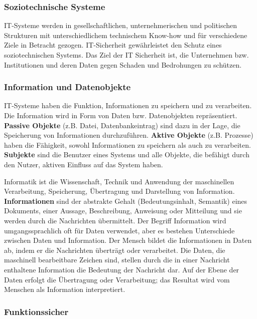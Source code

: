 \subsubsection{Soziotechnische Systeme}

IT-Systeme werden in gesellschaftlichen, unternehmerischen und politischen Strukturen mit unterschiedlichem technischem Know-how und für verschiedene Ziele in Betracht gezogen\cite[23]{eckert2013sicherheit}. IT-Sicherheit gewährleistet den Schutz eines soziotechnischen Systems. Das Ziel der IT Sicherheit ist, die Unternehmen bzw. Institutionen und deren Daten gegen Schaden und Bedrohungen zu schützen\cite{so18tech}. 

\subsubsection{Information und Datenobjekte}

IT-Systeme haben die Funktion, Informationen zu speichern und zu verarbeiten. Die Information wird in Form von Daten bzw. Datenobjekten repräsentiert. \textbf{Passive Objekte} (z.B. Datei, Datenbankeintrag) sind dazu in der Lage, die Speicherung von Informationen durchzuführen. \textbf{Aktive Objekte} (z.B. Prozesse) haben die Fähigkeit, sowohl Informationen zu speichern als auch zu verarbeiten\cite[23]{eckert2013sicherheit}.  \textbf{Subjekte} sind die Benutzer eines Systems und alle Objekte, die befähigt durch den Nutzer, aktiven Einfluss auf das System haben\cite[24]{eckert2013sicherheit}.  

Informatik ist die Wissenschaft, Technik und Anwendung der maschinellen Verarbeitung, Speicherung, Übertragung und Darstellung von Information. \textbf{Informationen} sind der abstrakte Gehalt (Bedeutungsinhalt, Semantik) eines Dokuments, einer Aussage, Beschreibung, Anweisung oder Mitteilung\cite[5]{broy2013informatik} und sie werden durch die Nachrichten übermittelt\cite[18]{blieberger2013informatik}. Der Begriff Information wird umgangssprachlich oft für Daten verwendet, aber es bestehen Unterschiede zwischen Daten und Information. Der Mensch bildet die Informationen in Daten ab, indem er die Nachrichten überträgt oder verarbeitet. Die Daten, die maschinell bearbeitbare Zeichen sind, stellen durch die in einer Nachricht enthaltene Information die Bedeutung der Nachricht dar. Auf der Ebene der Daten erfolgt die Übertragung oder Verarbeitung; das Resultat wird vom Menschen als Information interpretiert\cite{infstd}.

\subsubsection{Funktionssicher}

